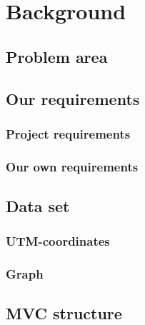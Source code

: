 \chapter{Background}
\section{Problem area}

\section{Our requirements}
\subsection{Project requirements}
\subsection{Our own requirements}

\section{Data set}
\subsection{UTM-coordinates}
\subsection{Graph}

\section{MVC structure}